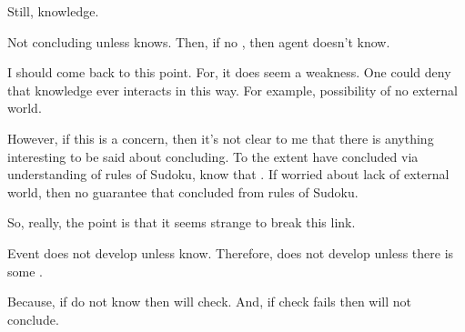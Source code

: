 \begin{note}
  Still, knowledge.

  Not concluding unless knows.
  Then, if no \pevent{}, then agent doesn't know.
  {
    \color{red}
    I should come back to this point.
    For, it does seem a weakness.
    One could deny that knowledge ever interacts in this way.
    For example, possibility of no external world.

    However, if this is a concern, then it's not clear to me that there is anything interesting to be said about concluding.
    To the extent have concluded via understanding of rules of Sudoku, know that \pevent{}.
    If worried about lack of external world, then no guarantee that concluded from rules of Sudoku.

    So, really, the point is that it seems strange to break this link.
  }

  Event does not develop unless know.
  Therefore, does not develop unless there is some \pevent{}.

  Because, if do not know then will check.
  And, if check fails then will not conclude.
\end{note}




